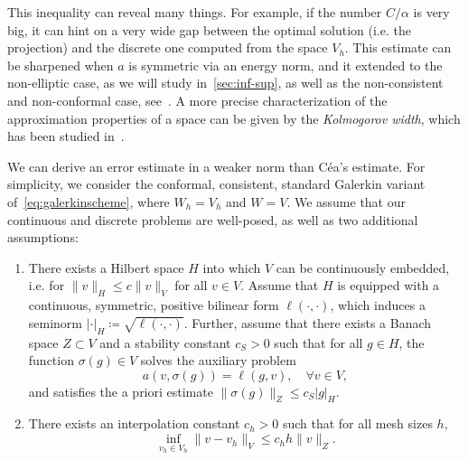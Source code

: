 This inequality can reveal many things. For example, if the number $C/\alpha$ is very big, it can hint on a very wide gap between the optimal solution (i.e. the projection) and the discrete one computed from the space $V_h$. This estimate can be sharpened when $a$ is symmetric via an energy norm, and it extended to the non-elliptic case, as we will study in~\ref{sec:inf-sup}, as well as the non-consistent and non-conformal case, see~\cite[Sect. 2.3.2]{ern2004theory}. A more precise characterization of the approximation properties of a space can be given by the \emph{Kolmogorov width}, which has been studied in~\cite{evans2009n}.

We can derive an error estimate in a weaker norm than Céa's estimate. For simplicity, we consider the conformal, consistent, standard Galerkin variant of~\ref{eq:galerkinscheme}, where $W_h=V_h$ and $W=V$. We assume that our continuous and discrete problems are well-posed, as well as two additional assumptions: 
\begin{enumerate}
    \item There exists a Hilbert space $H$ into which $V$ can be continuously embedded, i.e. for $\|v\|_H \leq c\|v\|_V$ for all $v\in V$. Assume that $H$ is equipped with a continuous, symmetric, positive bilinear form $\ell(\cdot,\cdot)$, which induces a seminorm $|\cdot|_H \coloneqq\sqrt{\ell(\cdot,\cdot)}$. Further, assume that there exists a Banach space $Z\subset V$ and a stability constant $c_S>0$ such that for all $g\in H$, the function $\sigma(g)\in V$ solves the auxiliary problem
    \begin{equation*}
        a(v, \sigma(g)) = \ell(g, v),\quad \forall v\in V,
    \end{equation*}
    and satisfies the a priori estimate $\|\sigma(g)\|_Z \leq c_S |g|_H$.
    \item There exists an interpolation constant $c_h>0$ such that for all mesh sizes $h$, 
    \begin{equation*}
        \inf_{v_h\in V_h} \|v-v_h\|_V \leq c_h h \|v\|_Z.
    \end{equation*}
\end{enumerate}

